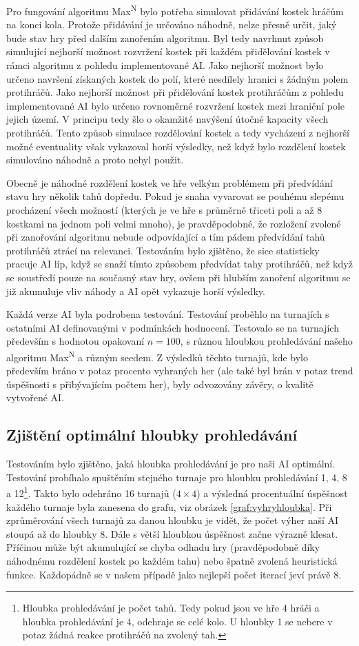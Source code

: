 \documentclass[a4paper]{article}
\begin{document}
Pro fungování algoritmu Max\textsuperscript{N} bylo potřeba simulovat přidávání kostek hráčům na konci kola. Protože přidávání je určováno náhodně, nelze přesně určit, jaký bude stav hry před dalším zanořením algoritmu. Byl tedy navrhnut způsob simulující nejhorší možnost rozvržení kostek při každém přidělování kostek v rámci algoritmu z pohledu implementované AI. Jako nejhorší možnost bylo určeno navršení získaných kostek do polí, které nesdílely hranici s žádným polem protihráčů. Jako nejhorší možnost při přidělování kostek protihráčům z pohledu implementované AI bylo určeno rovnoměrné rozvržení kostek mezi hraniční pole jejich území. V principu tedy šlo o okamžité navýšení útočné kapacity všech protihráčů. Tento způsob simulace rozdělování kostek a tedy vycházení z nejhorší možné eventuality však vykazoval horší výsledky, než když bylo rozdělení kostek simulováno náhodně a proto nebyl použit.

Obecně je náhodné rozdělení kostek ve hře velkým problémem při předvídání stavu hry několik tahů dopředu. Pokud je snaha vyvarovat se pouhému slepému procházení všech možností (kterých je ve hře s průměrně třiceti poli a až 8 kostkami na jednom poli velmi mnoho), je pravděpodobné, že rozložení zvolené při zanořování algoritmu nebude odpovídající a tím pádem předvídání tahů protihráčů ztrácí na relevanci. Testováním bylo zjištěno, že sice statisticky pracuje AI líp, když se snaží tímto způsobem předvídat tahy protihráčů, než když se soustředí pouze na současný stav hry, ovšem při hlubším zanoření algoritmu se již akumuluje vliv náhody a AI opět vykazuje horší výsledky.

Každá verze AI byla podrobena testování. Testování proběhlo na turnajích s ostatními AI definovanými v podmínkách hodnocení. Testovalo se na turnajích především s hodnotou opakovaní $n=100$, s různou hloubkou prohledávání našeho algoritmu Max\textsuperscript{N} a různým seedem. Z výsledků těchto turnajů, kde bylo především bráno v potaz procento vyhraných her (ale také byl brán v potaz trend úspěšnosti s přibývajícím počtem her), byly odvozovány závěry, o kvalitě vytvořené AI.

\subsection{Zjištění optimální hloubky prohledávání}
\label{sec:testhloubky}
Testováním bylo zjištěno, jaká hloubka prohledávání je pro naši AI optimální. Testování probíhalo spuštěním stejného turnaje pro hloubku prohledávání 1, 4, 8 a 12\footnote{Hloubka prohledávání je počet tahů. Tedy pokud jsou ve hře 4 hráči a hloubka prohledávání je 4, odehraje se celé kolo. U hloubky 1 se nebere v potaz žádná reakce protihráčů na zvolený tah.}. Takto bylo odehráno 16 turnajů ($4\times4$) a výsledná procentuální úspěšnost každého turnaje byla zanesena do grafu, viz obrázek \ref{graf:vyhryhloubka}. Při zprůměrování všech turnajů za danou hloubku je vidět, že počet výher naší AI stoupá až do hloubky 8. Dále s větší hloubkou úspěšnost začne výrazně klesat. Příčinou může být akumulující se chyba odhadu hry (pravděpodobně díky náhodnému rozdělení kostek po každém tahu) nebo špatně zvolená heuristická funkce. Každopádně se v našem případě jako nejlepší počet iterací jeví právě 8.
\end{document}
